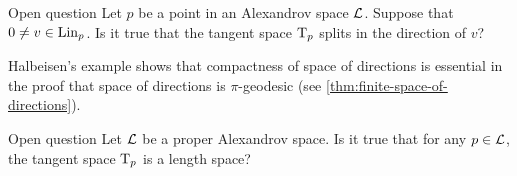 \begin{thm}{Open question}
Let $p$ be a point in an Alexandrov space $\mathcal{L}$.
Suppose that $0\ne v\in \mathop{\rm Lin}\nolimits_p$.
Is it true that the tangent space $\mathrm{T}_p$ splits in the direction of $v$?
\end{thm}

Halbeisen's example \cite{alexander-kapovitch-petrunin2024,halbeisen} shows that compactness of space of directions is essential in the proof that space of directions is $\pi$-geodesic (see \ref{thm:finite-space-of-directions}).

\begin{thm}{Open question}\label{open:Halb-proper}
Let $\mathcal{L}$ be a proper Alexandrov space.
Is it true that for any $p\in \mathcal{L}$, the tangent space $\mathrm{T}_p$ is a length space?
\end{thm}
